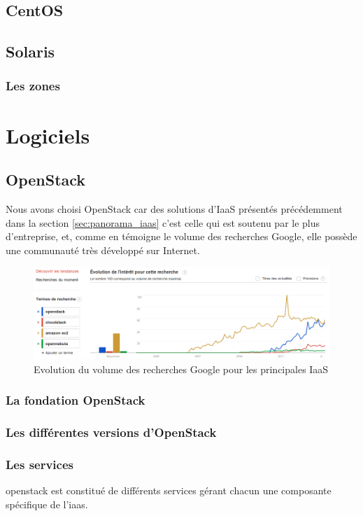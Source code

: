 \documentclass[a4paper,oneside]{report}
\begin{document}
\section{CentOS}

\section{Solaris}

\subsection{Les zones}


\chapter{Logiciels}
\section{OpenStack}
Nous avons choisi OpenStack car des solutions d'IaaS présentés précédemment dans la section \ref{sec:panorama_iaas} c'est celle qui est soutenu par le plus d'entreprise, et, comme en témoigne le volume des recherches Google, elle possède une communauté très développé sur Internet.
\begin{figure}[h!]
\centering
\includegraphics[resolution=140]{images/recherches_iaas.png}
\caption{Evolution du volume des recherches Google pour les principales IaaS}
\end{figure}


\subsection{La fondation OpenStack}

\subsection{Les différentes versions d'OpenStack}


\subsection{Les services}
\gls{openstack} est constitué de différents services gérant chacun une composante spécifique de l'\gls{iaas}.
\end{document}
